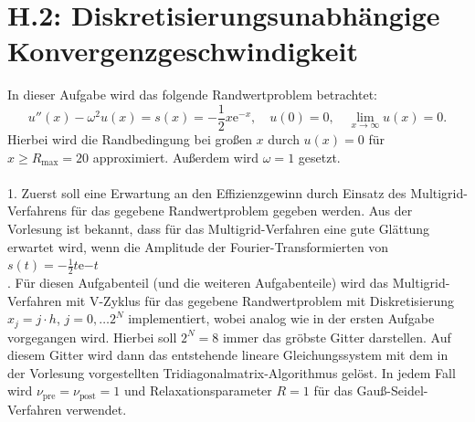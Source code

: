 \documentclass[11pt,a4paper]{article}
\begin{document}
\section*{H.2: Diskretisierungsunabhängige Konvergenzgeschwindigkeit}\label{sec:h2}

In dieser Aufgabe wird das folgende Randwertproblem betrachtet:
\begin{equation*}
    u''(x) - \omega^2 u(x) = s(x) = -\frac{1}{2} x \mathrm{e}^{-x} , \quad u(0) = 0 , \quad \lim_{x \to \infty} u(x) = 0.
\end{equation*} Hierbei wird die Randbedingung bei großen $x$ durch $u(x) = 0$ für $x \geq R_{\mathrm{max}} = 20$ approximiert. Außerdem wird $\omega = 1$ gesetzt.\\ \\
1. Zuerst soll eine Erwartung an den Effizienzgewinn durch Einsatz des Multigrid-Verfahrens für das gegebene Randwertproblem gegeben werden. Aus der Vorlesung ist bekannt, dass für das Multigrid-Verfahren eine gute Glättung erwartet wird, wenn die Amplitude
der Fourier-Transformierten von $s(t) = -\frac{1}{2}t \mathrm{e}{-t}$ \\

. Für diesen Aufgabenteil (und die weiteren Aufgabenteile) wird das Multigrid-Verfahren mit V-Zyklus für das gegebene Randwertproblem mit Diskretisierung $x_j = j \cdot h$, $j = 0 , \dots 2^N$ implementiert, wobei analog
wie in der ersten Aufgabe vorgegangen wird. Hierbei soll $2^N = 8$ immer das gröbste Gitter darstellen. Auf diesem Gitter wird dann das entstehende lineare Gleichungssystem mit dem in der Vorlesung vorgestellten Tridiagonalmatrix-Algorithmus gelöst.
In jedem Fall wird $\nu_{\mathrm{pre}} = \nu_{\mathrm{post}} = 1$ und Relaxationsparameter $R = 1$ für das Gauß-Seidel-Verfahren verwendet. \\
\end{document}
